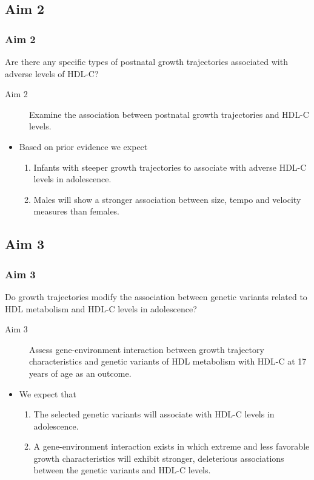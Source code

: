 \documentclass[10pt]{beamer}\usepackage[]{graphicx}\usepackage[]{color}
\begin{document}
\subsection{Aim 2}
\begin{frame}
\frametitle{Aim 2}
Are there any specific types of postnatal growth trajectories associated with adverse levels of HDL-C?
\smallskip

\begin{description}
	\item[Aim 2] Examine the association between postnatal growth trajectories and HDL-C levels.
\end{description}

\begin{itemize} 
\item Based on prior evidence we expect
	\begin{enumerate} 
		\item Infants with steeper growth trajectories to associate with adverse HDL-C levels in adolescence.
		\item Males will show a stronger association between size, tempo and velocity measures than females.
		\end{enumerate}
\end{itemize}
\end{frame}

\subsection{Aim 3}
\begin{frame}
\frametitle{Aim 3}
Do growth trajectories modify the association between genetic variants related to HDL metabolism and HDL-C levels in adolescence?
\begin{description}
	\item[Aim 3] Assess gene-environment interaction between growth trajectory characteristics and genetic variants of HDL metabolism with HDL-C at 17 years of age as an outcome.
\end{description}

\begin{itemize}
\item We expect that
	\begin{enumerate} 
		\item The selected genetic variants will associate with HDL-C levels in adolescence.
		\item A gene-environment interaction exists in which extreme and less favorable growth characteristics will exhibit stronger, deleterious associations between the genetic variants and HDL-C levels.
		\end{enumerate}
\end{itemize}

\end{frame}
\end{document}
